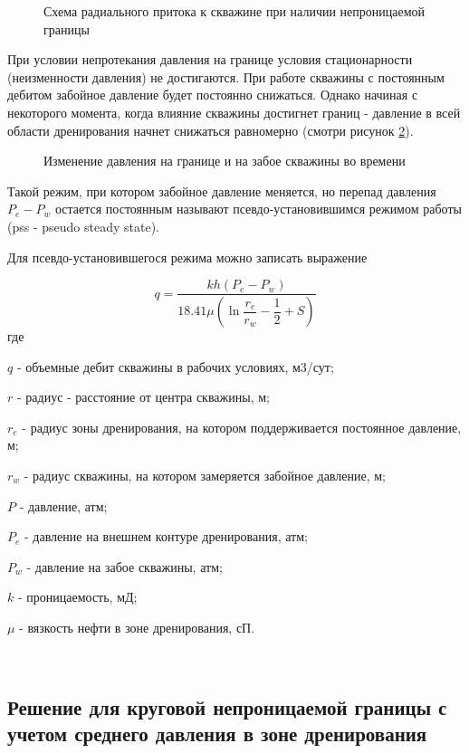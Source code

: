 \begin{figure}[h!]
	\begin{center}
		
		\caption{Схема радиального притока к скважине при наличии непроницаемой границы}
		\label{ris:radial_inflow_steady_state_2}
	\end{center}
\end{figure}

При условии непротекания давления на границе условия стационарности (неизменности давления) не достигаются. При работе скважины с постоянным дебитом забойное давление будет постоянно снижаться. Однако начиная с некоторого момента, когда влияние скважины достигнет границ - давление в всей области дренирования начнет снижаться равномерно (смотри рисунок \ref{ris:radial_pss_dynamics}). 

\begin{figure}[h!]
	\begin{center}
		
		\caption{Изменение давления на границе и на забое скважины во времени}
		\label{ris:radial_pss_dynamics}
	\end{center}
\end{figure}

Такой режим, при котором забойное давление меняется, но перепад давления $P_e - P_w$ остается постоянным называют псевдо-установившимся режимом работы (pss - pseudo steady state). 

Для псевдо-установившегося режима можно записать выражение

$$q=\frac{kh\left(P_e-P_w\right)}{ 18.41 \mu\left(\ln{\dfrac{r_e}{r_w}} - \dfrac{1}{2} + S\right)}$$
где 

$q$ - объемные дебит скважины в рабочих условиях, м3/сут;

$r$ -  радиус - расстояние от центра скважины, м;

$r_e$ -  радиус зоны дренирования, на котором поддерживается постоянное давление, м;

$r_w$ - радиус скважины, на котором замеряется забойное давление, м;

$P$ - давление, атм;

$P_e$ - давление на внешнем контуре дренирования, атм;

$P_w$ - давление на забое скважины, атм;

$k$ - проницаемость, мД;

$\mu$ - вязкость нефти в зоне дренирования, сП.

\

\subsection{Решение для круговой непроницаемой границы с учетом среднего давления в зоне дренирования}

